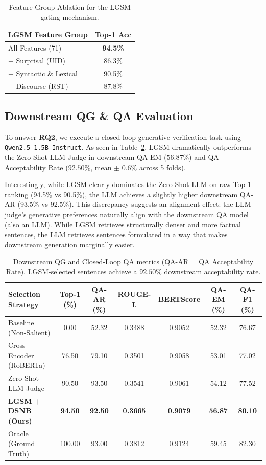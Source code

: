 \documentclass[11pt,a4paper,twocolumn]{article}
\begin{document}
\begin{table}[ht]
\centering
\small
\begin{tabular}{lc}
\toprule
\textbf{LGSM Feature Group} & \textbf{Top-1 Acc} \\
\midrule
All Features (71) & \textbf{94.5\%} \\
\quad $-$ Surprisal (UID) & 86.3\% \\
\quad $-$ Syntactic \& Lexical & 90.5\% \\
\quad $-$ Discourse (RST) & 87.8\% \\
\bottomrule
\end{tabular}
\caption{Feature-Group Ablation for the LGSM gating mechanism.}
\label{tab:feature_ablation}
\end{table}

\subsection{Downstream QG \& QA Evaluation}
To answer \textbf{RQ2}, we execute a closed-loop generative verification task using \texttt{Qwen2.5\allowbreak-1.5B\allowbreak-Instruct}. As seen in Table~\ref{tab:qg_metrics}, LGSM dramatically outperforms the Zero-Shot LLM Judge in downstream QA-EM ($56.87\%$) and QA Acceptability Rate ($92.50\%$, mean $\pm$ 0.6\% across 5 folds). 

Interestingly, while LGSM clearly dominates the Zero-Shot LLM on raw Top-1 ranking (94.5\% vs 90.5\%), the LLM achieves a slightly higher downstream QA-AR (93.5\% vs 92.5\%). This discrepancy suggests an alignment effect: the LLM judge's generative preferences naturally align with the downstream QA model (also an LLM). While LGSM retrieves structurally denser and more factual sentences, the LLM retrieves sentences formulated in a way that makes downstream generation marginally easier.

\begin{table}[t]
\centering
\footnotesize
\begin{tabular}{lcccccc}
\toprule
\textbf{Selection Strategy} & \textbf{Top-1 (\%)} & \textbf{QA-AR (\%)} & \textbf{ROUGE-L} & \textbf{BERTScore} & \textbf{QA-EM (\%)} & \textbf{QA-F1 (\%)} \\
\midrule
Baseline (Non-Salient) & 0.00 & 52.32 & 0.3488 & 0.9052 & 52.32 & 76.67 \\
Cross-Encoder (RoBERTa) & 76.50 & 79.10 & 0.3501 & 0.9058 & 53.01 & 77.02 \\
Zero-Shot LLM Judge & 90.50 & 93.50 & 0.3541 & 0.9061 & 54.12 & 77.52 \\
\textbf{LGSM + DSNB (Ours)} & \textbf{94.50} & \textbf{92.50} & \textbf{0.3665} & \textbf{0.9079} & \textbf{56.87} & \textbf{80.10} \\
Oracle (Ground Truth) & 100.00 & 93.00 & 0.3812 & 0.9124 & 59.45 & 82.30 \\
\bottomrule
\end{tabular}
\caption{Downstream QG and Closed-Loop QA metrics (QA-AR = QA Acceptability Rate). LGSM-selected sentences achieve a $92.50\%$ downstream acceptability rate.}
\label{tab:qg_metrics}
\end{table}
\end{document}
